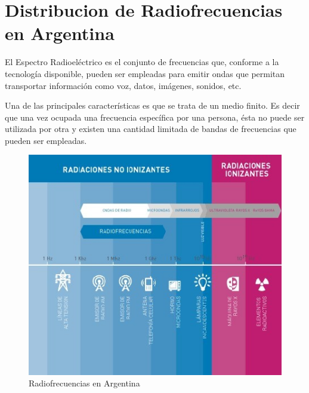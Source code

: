\chapter{Distribucion de Radiofrecuencias en Argentina}
El Espectro Radioeléctrico es el conjunto de frecuencias que, conforme a la tecnología disponible, 
pueden ser empleadas para emitir ondas que permitan transportar información como voz, datos, 
imágenes, sonidos, etc.

Una de las principales características es que se trata de un medio finito. Es decir que una vez 
ocupada una frecuencia específica por una persona, ésta no puede ser utilizada por otra y existen 
una cantidad limitada de bandas de frecuencias que pueden ser empleadas.

\begin{figure}[ht]
    \begin{center}
        \includegraphics{contenido/img/radiofrecuencias.jpg}
        \caption{Radiofrecuencias en Argentina}
        \label{fig:rad_frec}
    \end{center}
\end{figure}

